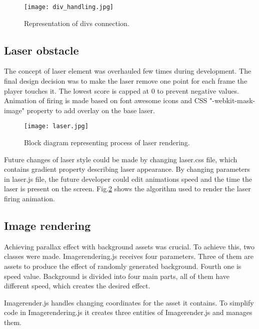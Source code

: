 \documentclass[oneside,a4paper,11pt]{report}
\begin{document}
\newpage

\vspace*{0.5in}

\begin{figure}
	\centering
	\texttt{[image: div\_handling.jpg]}
	\caption{Representation of divs connection.\label{fig:div_handling}}
\end{figure}

\vspace*{0.5in}

\subsection{Laser obstacle}
The concept of laser element was overhauled few times during development. The final design decision was to make the laser remove one point for each frame the player touches it. The lowest score is capped at 0 to prevent negative values. Animation of firing is made based on font awesome icons and CSS "-webkit-mask-image" property to add overlay on the base laser.

\begin{figure}
	\centering
	\texttt{[image: laser.jpg]}
	\caption{Block diagram representing process of laser rendering.\label{fig:laser}}
\end{figure}

\par
Future changes of laser style could be made by changing laser.css file, which contains gradient property describing laser appearance. By changing parameters in laser.js file, the future developer could edit animations speed and the time the laser is present on the screen. Fig.\ref{fig:laser} shows the algorithm used to render the laser firing animation.

\subsection{Image rendering}
Achieving parallax effect with background assets was crucial. To achieve this, two classes were made. Image\textunderscore rendering.js receives four parameters. Three of them are assets to produce the effect of randomly generated background. Fourth one is speed value. Background is divided into four main parts, all of them have different speed, which creates the desired effect.

\par
Image\textunderscore render.js handles changing coordinates for the asset it contains. To simplify code in Image\textunderscore rendering.js it creates three entities of Image\textunderscore render.js and manages them.
\end{document}
